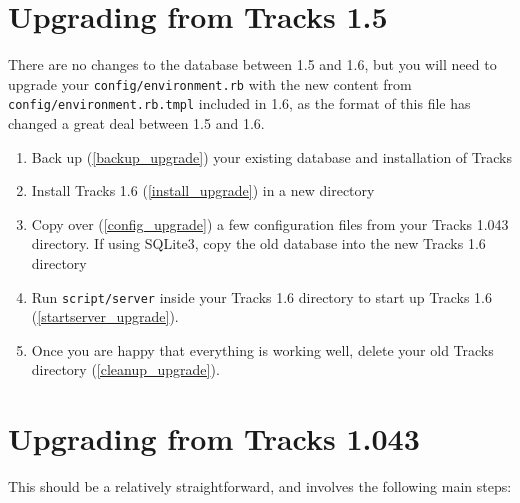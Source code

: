 \documentclass[10pt,twoside]{memoir}
\begin{document}
\section{Upgrading from Tracks 1.5}
\label{upgrading_1.5}

There are no changes to the database between 1.5 and 1.6, but you will need to upgrade your \texttt{config/environment.rb} with the new content from \texttt{config/environment.rb.tmpl} included in 1.6, as the format of this file has changed a great deal between 1.5 and 1.6.


\begin{enumerate}


\item Back up (\autoref{backup_upgrade}) your existing database and installation of Tracks

\item Install Tracks 1.6 (\autoref{install_upgrade}) in a new directory

\item Copy over (\autoref{config_upgrade}) a few configuration files from your Tracks 1.043 directory. If using SQLite3, copy the old database into the new Tracks 1.6 directory

\item Run \texttt{script/server} inside your Tracks 1.6 directory to start up Tracks 1.6 (\autoref{startserver_upgrade}).

\item Once you are happy that everything is working well, delete your old Tracks directory (\autoref{cleanup_upgrade}).
\end{enumerate}

\section{Upgrading from Tracks 1.043}
\label{upgrading_1043}

This should be a relatively straightforward, and involves the following main steps:
\end{document}
